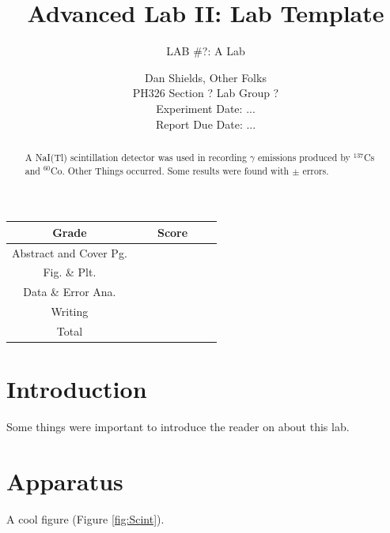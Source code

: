 \documentclass[10pt,letterpaper]{journal}
\title{Advanced Lab II: Lab Template}
\subtitle{LAB \#?: A Lab}
\author{Dan Shields, Other Folks\\
  PH326 Section ? Lab Group ?\\
  Experiment Date: ...\\
  Report Due Date: ...}
\begin{document}
\maketitle

\begin{abstract}

A NaI(Tl) scintillation detector was used in recording $\gamma$ emissions produced by $^{137}$Cs and $^{60}$Co. Other Things occurred. Some results were found with $\pm$ errors.

\end{abstract}

\begin{table}
\begin{center}
\small{
\begin{tabular}[H]{|c|c|}\hline
Grade & \ \ \ Score \ \ \ \\\hline
Abstract and Cover Pg. & \\\hline
Fig. \& Plt. &  \\\hline
Data \& Error Ana. &  \\\hline
Writing &  \\\hline
Total &  \\\hline
\end{tabular}
}
\end{center}
\end{table}


\pagebreak
\section{Introduction}
Some things were important to introduce the reader on about this lab.

\section{Apparatus}
 A cool figure (Figure \ref{fig:Scint}).
\end{document}
